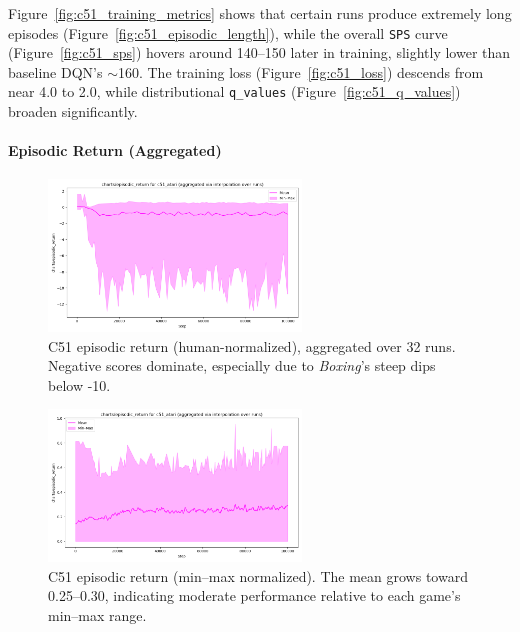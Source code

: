 Figure~\vref{fig:c51_training_metrics} shows that certain runs produce extremely long episodes 
(Figure~\ref{fig:c51_episodic_length}), 
while the overall \texttt{SPS} curve (Figure~\ref{fig:c51_sps}) hovers around 140--150 later in training, 
slightly lower than baseline DQN's $\sim$\num{160}. 
The training loss (Figure~\ref{fig:c51_loss}) descends from near 4.0 to 2.0, 
while distributional \texttt{q\_values} (Figure~\ref{fig:c51_q_values}) broaden significantly.

\paragraph{Episodic Return (Aggregated)}

\begin{figure}
	\centering
	\includegraphics[width=0.6\textwidth]{figures/c51/charts_episodic_return_human_c51_atari.png}
	\caption{C51 episodic return (human-normalized), aggregated over 32 runs. 
		Negative scores dominate, especially due to \emph{Boxing}'s steep dips below -10.}
	\label{fig:c51_return_human}
\end{figure}

\begin{figure}
	\centering
	\includegraphics[width=0.6\textwidth]{figures/c51/charts_episodic_return_minmax_c51_atari.png}
	\caption{C51 episodic return (min--max normalized). 
		The mean grows toward 0.25--0.30, indicating moderate performance relative to each game's min--max range.}
	\label{fig:c51_return_minmax}
\end{figure}

